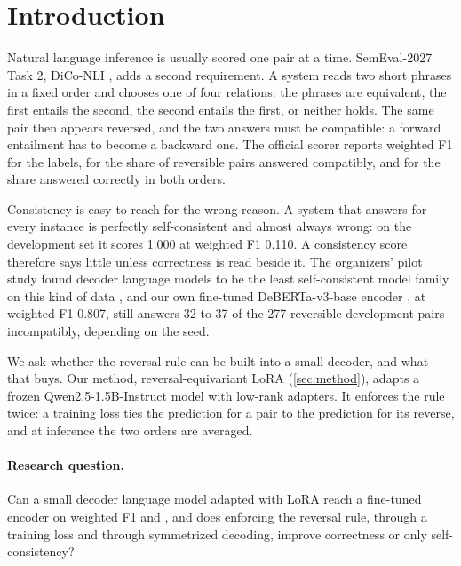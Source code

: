 \section{Introduction}
\label{sec:introduction}

Natural language inference is usually scored one pair at a time. SemEval-2027 Task 2, DiCo-NLI \citep{dico-nli-2027-task}, adds a second requirement. A system reads two short phrases in a fixed order and chooses one of four relations: the phrases are equivalent, the first entails the second, the second entails the first, or neither holds. The same pair then appears reversed, and the two answers must be compatible: a forward entailment has to become a backward one. The official scorer reports weighted F1 for the labels, \SoftCons{} for the share of reversible pairs answered compatibly, and \HardCons{} for the share answered correctly in both orders.

Consistency is easy to reach for the wrong reason. A system that answers \EQ{} for every instance is perfectly self-consistent and almost always wrong: on the development set it scores \SoftCons{} 1.000 at weighted F1 0.110. %
A consistency score therefore says little unless correctness is read beside it. The organizers' pilot study found decoder language models to be the least self-consistent model family on this kind of data \citep{apaolaza-larraya-etal-2026-assessing}, and our own fine-tuned DeBERTa-v3-base encoder \citep{he-etal-2023-debertav3}, at weighted F1 0.807, still answers 32 to 37 of the 277 reversible development pairs incompatibly, depending on the seed. %

We ask whether the reversal rule can be built into a small decoder, and what that buys. Our method, reversal-equivariant LoRA (\cref{sec:method}), adapts a frozen Qwen2.5-1.5B-Instruct model with low-rank adapters. It enforces the rule twice: a training loss ties the prediction for a pair to the prediction for its reverse, and at inference the two orders are averaged.

\paragraph{Research question.} Can a small decoder language model adapted with LoRA reach a fine-tuned encoder on weighted F1 and \HardCons{}, and does enforcing the reversal rule, through a training loss and through symmetrized decoding, improve correctness or only self-consistency?

